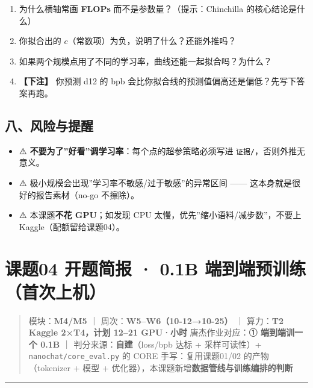 \documentclass[
  chinese,
  11pt,
]{ctexart}
\providecommand{\tightlist}{%
  \setlength{\itemsep}{0pt}\setlength{\parskip}{0pt}}
\begin{document}
\begin{enumerate}
\def\labelenumi{\arabic{enumi}.}
\tightlist
\item
  为什么横轴常画 \textbf{FLOPs} 而不是参数量？（提示：Chinchilla 的核心结论是什么）
\item
  你拟合出的 \(c\)（常数项）为负，说明了什么？还能外推吗？
\item
  如果两个规模点用了不同的学习率，曲线还能一起拟合吗？为什么？
\item
  \textbf{【下注】} 你预测 d12 的 bpb 会比你拟合线的预测值偏高还是偏低？先写下答案再跑。
\end{enumerate}

\subsection{八、风险与提醒}\label{ux516bux98ceux9669ux4e0eux63d0ux9192-1}

\begin{itemize}
\tightlist
\item
  ⚠️ \textbf{不要为了''好看''调学习率}：每个点的超参策略必须写进 \texttt{证据/}，否则外推无意义。
\item
  ⚠️ 极小规模会出现''学习率不敏感/过于敏感''的异常区间 ------ 这本身就是很好的报告素材（no-go 不擦除）。
\item
  ⚠️ 本课题\textbf{不花 GPU}；如发现 CPU 太慢，优先''缩小语料/减步数''，不要上 Kaggle（配额留给课题04）。
\end{itemize}

\newpage

\section{\texorpdfstring{课题04 开题简报 · 0.1B 端到端预训练（\textbf{首次上机}）}{课题04 开题简报 · 0.1B 端到端预训练（首次上机）}}\label{ux8bfeux989804-ux5f00ux9898ux7b80ux62a5-0.1b-ux7aefux5230ux7aefux9884ux8badux7ec3ux9996ux6b21ux4e0aux673a}

\begin{quote}
模块：\textbf{M4/M5} ｜ 周次：\textbf{W5--W6（10-12→10-25）} ｜ 算力：\textbf{T2 Kaggle 2×T4，计划 12--21 GPU·小时} 唐杰作业对应：\textbf{① 端到端训一个 0.1B} ｜ 判分来源：\textbf{自建}（loss/bpb 达标 + 采样可读性）+ \texttt{nanochat/core\_eval.py} 的 CORE 手写：复用课题01/02 的产物（tokenizer + 模型 + 优化器），本课题新增\textbf{数据管线与训练编排的判断}
\end{quote}

\begin{center}\rule{0.5\linewidth}{0.5pt}\end{center}
\end{document}
